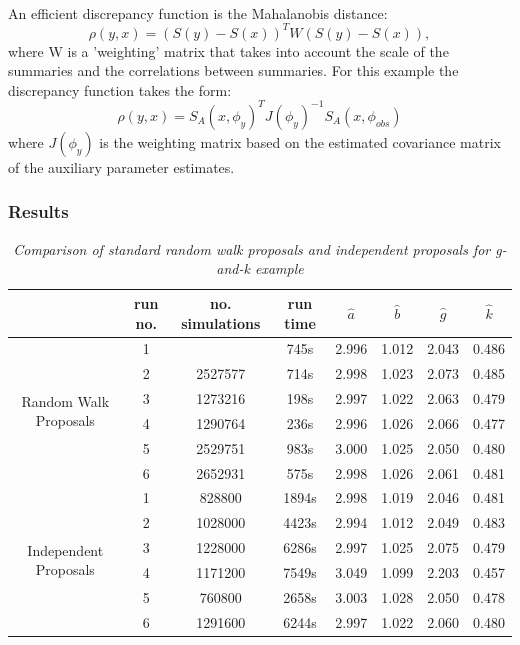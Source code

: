 \documentclass[12,fleqn]{article}
\theoremstyle{definition}
\theoremstyle{plain}
\begin{document}
\paragraph{}
An efficient discrepancy function is the Mahalanobis distance:
\begin{equation*}
\rho(y, x) = (S(y) - S(x))^T W (S(y) - S(x)),
\end{equation*}
where W is a 'weighting' matrix that takes into account the scale of the summaries and the correlations between summaries. For this example the discrepancy function takes the form:
\begin{equation*}
\rho(y, x) = S_A(x, \phi_y)^T J(\phi_y)^{-1} S_A(x, \phi_{obs})
\end{equation*}
where $J(\phi_y)$ is the weighting matrix based on the estimated covariance matrix of the auxiliary parameter estimates.
\par

\subsubsection{Results}

\begin{table}[H]
\begin{center}
\begin{tabular} { | c | c | c | c | c | c | c | c |}
\hline
 & run no. & no. simulations  & run time & $\hat{a}$ &  $\hat{b}$ &  $\hat{g}$  &  $\hat{k}$\\
\hline
\multirow{6}{7em}{Random Walk Proposals} & 1 &   & 745s & 2.996 & 1.012 & 2.043 & 0.486  \\
& 2 & 2527577 & 714s & 2.998 & 1.023 & 2.073 & 0.485\\
& 3 & 1273216 & 198s & 2.997 & 1.022 & 2.063 & 0.479\\
& 4 & 1290764& 236s & 2.996 & 1.026  & 2.066 & 0.477\\
& 5 & 2529751 & 983s & 3.000 & 1.025 & 2.050 & 0.480\\
& 6 & 2652931 & 575s & 2.998 & 1.026 & 2.061 & 0.481\\
\hline
\multirow{6}{7em}{Independent Proposals} & 1 & 828800  & 1894s & 2.998 & 1.019 & 2.046 & 0.481 \\
& 2 & 1028000 & 4423s & 2.994 & 1.012 & 2.049 & 0.483\\
& 3 & 1228000 & 6286s & 2.997 & 1.025 & 2.075 & 0.479\\
& 4 & 1171200 & 7549s & 3.049 & 1.099  & 2.203 & 0.457\\
& 5 & 760800 & 2658s & 3.003 & 1.028 & 2.050 & 0.478\\
& 6 & 1291600 & 6244s & 2.997 & 1.022 & 2.060 & 0.480\\
\hline 
\end{tabular}
\caption{\textit{Comparison of standard random walk proposals and independent proposals for g-and-k example}}
\end{center} 
\end{table}
\end{document}
